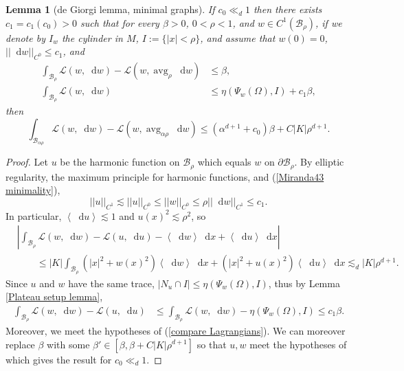 \documentclass[reqno,11pt]{amsart}
\DeclareMathOperator{\avg}{avg}
\newcommand*\dif{\mathop{}\!\mathrm{d}}
\newcommand{\Lagrange}{\mathscr L}
\def\Japan#1{\left \langle #1 \right \rangle}
\newtheorem{lemma}[theorem]{Lemma}
\theoremstyle{definition}
\numberwithin{equation}{section}
\begin{document}
\begin{lemma}[de Giorgi lemma, minimal graphs]\label{Miranda43}
If $c_0 \ll_d 1$ then there exists $c_1 = c_1(c_0) > 0$ such that for every $\beta > 0$, $0 < \rho < 1$, and $w \in C^1(\mathscr B_\rho)$, if we denote by
$I_w$ the cylinder in $M$, $I := \{|x| < \rho\}$, and assume that $w(0) = 0$, $||\dif w||_{C^0} \leq c_1$, and
\begin{align}
\int_{\mathscr B_\rho} \Lagrange(w, \dif w) - \Lagrange(w, \avg_\rho \dif w) &\leq \beta \label{Miranda43 oscillation}, \\
\int_{\mathscr B_\rho} \Lagrange(w, \dif w) &\leq \eta(\Psi_w(\Omega), I) + c_1 \beta \label{Miranda43 minimality},
\end{align}
then
\begin{equation}\label{Miranda43 concl}
\int_{\mathscr B_{\alpha \rho}} \Lagrange(w, \dif w) - \Lagrange(w, \avg_{\alpha \rho} \dif w) \leq (\alpha^{d + 1} + c_0) \beta + C|K|\rho^{d + 1}.
\end{equation}
\end{lemma}
\begin{proof}
Let $u$ be the harmonic function on $\mathscr B_\rho$ which equals $w$ on $\partial \mathscr B_\rho$.
By elliptic regularity, the maximum principle for harmonic functions, and (\ref{Miranda43 minimality}),
$$||u||_{C^1} \lesssim ||u||_{C^0} \leq ||w||_{C^0} \leq \rho ||\dif w||_{C^1} \leq c_1.$$
In particular, $\Japan{\dif u} \lesssim 1$ and $u(x)^2 \lesssim \rho^2$, so
\begin{align*}
&\left|\int_{\mathscr B_\rho} \Lagrange(w, \dif w) - \Lagrange(u, \dif u) - \Japan{\dif w} \dif x + \Japan{\dif u} \dif x\right| \\
&\qquad \leq |K| \int_{\mathscr B_\rho} (|x|^2 + w(x)^2) \Japan{\dif w} \dif x + (|x|^2 + u(x)^2) \Japan{\dif u} \dif x
\lesssim_d |K| \rho^{d + 1}.
\end{align*}
Since $u$ and $w$ have the same trace, $|N_u \cap I| \leq \eta(\Psi_w(\Omega), I)$, thus by Lemma \ref{Plateau setup lemma},
\begin{align*}
\int_{\mathscr B_\rho} \Lagrange(w, \dif w) - \Lagrange(u, \dif u) &\leq \int_{\mathscr B_\rho} \Lagrange(w, \dif w) - \eta(\Psi_w(\Omega), I) \leq c_1 \beta.
\end{align*}
Moreover, we meet the hypotheses of (\ref{compare Lagrangians}).
We can moreover replace $\beta$ with some $\beta' \in [\beta, \beta + C|K|\rho^{d + 1}]$ so that $u, w$ meet the hypotheses of \cite[Lemma 6.2]{Giusti77} which gives the result for $c_0 \ll_d 1$.
\end{proof}
\end{document}
